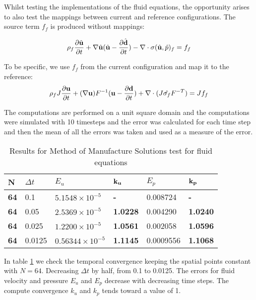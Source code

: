 Whilst testing the implementations of the fluid equations, the opportunity arises to also test the mappings between current and reference configurations.
The source term $f_f$ is produced without mappings:

$$ \rho_f \frac{\partial \hat{\bold{u}}}{\partial t}  +  \nabla \hat{\bold{u}} (\hat{\bold{u}} - \frac{\partial \hat{\bold{d}}}{\partial t})  -  \nabla \cdot \sigma(\hat{\bold{u}}, \hat{p})_f  = f_f $$

To be specific, we use $f_f$ from the current configuration and map it to the reference:
$$ \rho_f J \frac{\partial \bold{u}}{\partial t} + (\nabla \bold{u})F^{-1}(\bold{u}-\frac{\partial \bold{d}}{\partial t})  + \nabla \cdot( J \hat{\sigma_f} F^{-T}) = J f_f$$

The computations are performed on a unit square domain and the computations were simulated with 10 timesteps and the error was calculated for each time step and then the mean of all the errors was taken and used as a measure of the error.

\begin{table}[H]
\centering
\caption{Results for Method of Manufacture Solutions test for fluid equations}
\label{tab:MMS_Flu?id_time}
\begin{tabular}{|l|l|l|l|l|l|}
\hline
\textbf{N} & $\Delta t$ & $E_u$ & $\bold{k_u}$ & $E_p$ & $\bold{k_p}$ \\ \hline
\textbf{64} & 0.1 & $5.1548 \times 10^{-5}$ & \textbf{-} & 0.008724 & \textbf{-} \\ \hline
\textbf{64} & 0.05 & $2.5369 \times 10^{-5}$ & \textbf{1.0228} & 0.004290 & \textbf{1.0240} \\ \hline
\textbf{64} & 0.025 & $1.2200 \times 10^{-5}$ & \textbf{1.0561} & 0.002058 & \textbf{1.0596} \\ \hline
\textbf{64} & 0.0125 & $0.56344 \times 10^{-5}$ & \textbf{1.1145} & 0.0009556 & \textbf{1.1068} \\ \hline
\end{tabular}
\end{table}

In table \ref{tab:MMS_Flu?id_time} we check the temporal convergence keeping the spatial points constant with $N=64$. Decreasing $\Delta t$ by half, from 0.1 to 0.0125. The errors for fluid velocity and pressure $E_u$ and $E_p$ decrease with decreasing time steps. The compute convergence $k_u$ and $k_p$ tends toward a value of 1.

